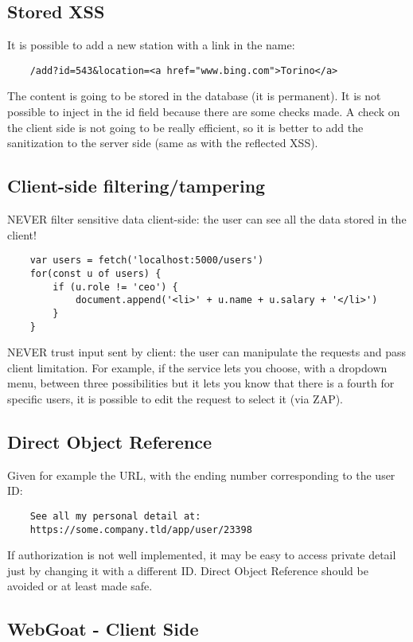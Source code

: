 \documentclass[a4paper, 10pt, titlepage]{article}
\begin{document}
\subsection{Stored XSS}
It is possible to add a new station with a link in the name:
\begin{lstlisting}
	/add?id=543&location=<a href="www.bing.com">Torino</a>
\end{lstlisting}
The content is going to be stored in the database (it is permanent).
It is not possible to inject in the id field because there are some checks made. A check on the client side is not going to be really efficient, so it is better to add the sanitization to the server side (same as with the reflected XSS).
\subsection{Client-side filtering/tampering}
NEVER filter sensitive data client-side: the user can see all the data stored in the client!
\begin{lstlisting}
	var users = fetch('localhost:5000/users')
	for(const u of users) {
		if (u.role != 'ceo') {
			document.append('<li>' + u.name + u.salary + '</li>')
		}
	}
\end{lstlisting}
NEVER trust input sent by client: the user can manipulate the requests and pass client limitation. For example, if the service lets you choose, with a dropdown menu, between three possibilities but it lets you know that there is a fourth for specific users, it is possible to edit the request to select it (via ZAP).

\subsection{Direct Object Reference}
Given for example the URL, with the ending number corresponding to the user ID:
\begin{lstlisting}
	See all my personal detail at:
	https://some.company.tld/app/user/23398
\end{lstlisting}
If authorization is not well implemented, it may be easy to access private detail just by changing it with a different ID. Direct Object Reference should be avoided or at least made safe.


\subsection{WebGoat - Client Side}
\end{document}
